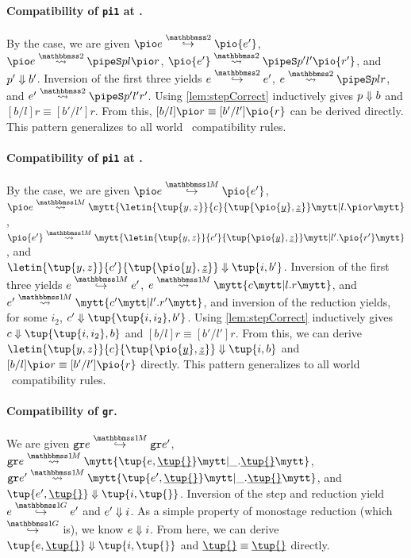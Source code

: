 \begin{abstrsyn}
\paragraph{Compatibility of {\tt pi1} at \bbtwo.}
By the case, we are given 
$\steptwo {\pio e} {\pio {e'}}$, \\
\mbox{$\splittwo {\pio e} A p l {\pio r}$}, 
$\splittwo {\pio {e'}} A {p'} {l'} {\pio {r'}}$,
and ${p'} \Downarrow {b'}$.
Inversion of the first three yields
$\steptwo e {e'}$, $\splittwo e A p l r$, and \mbox{$\splittwo {e'} A {p'} {l'} {r'}$}.
Using \ref{lem:stepCorrect} inductively gives ${p} \Downarrow {b}$ and $[b/l]r \equiv [b'/l']r$.
From this, \mbox{$[b/l]\pio r \equiv [b'/l']\pio {r}$} can be derived directly.
This pattern generalizes to all world \bbtwo\ compatibility rules.

\paragraph{Compatibility of {\tt pi1} at \bbonem.}
By the case, we are given
$\stepmix {\pio e} {\pio {e'}}$, \\
\mbox{$\splitone {\pio e} A {\letin{\tup{y,z}}{c}{\tup{\pio {\exv y},\exv z}}} {l.\pio r}$}, \\
\mbox{$\splitone {\pio {e'}} A {\letin{\tup{y,z}}{c'}{\tup{\pio {\exv y},\exv z}}} {l'.\pio {r'}}$}, and \\
\mbox{$\reduce {\letin{\tup{y,z}}{c'}{\tup{\pio {\exv y},\exv z}}} {\tup{i,b'}}$}.
Inversion of the first three yields 
$\stepmix e {e'}$, $\splitone e A c {l.r}$, and $\splitone {e'} A {c'} {l'.r'}$, 
and inversion of the reduction yields, for some $i_2$, \mbox{$\reduce {c'} {\tup{\tup{i,i_2},b'}}$}.
Using \ref{lem:stepCorrect} inductively gives $\reduce c {\tup{\tup{i,i_2},b}}$ and $[b/l]r \equiv [b'/l']r$.
From this, we can derive $\reduce {\letin{\tup{y,z}}{c}{\tup{\pio {\exv y},\exv z}}} {\tup{i,b}}$ and 
$[b/l]\pio r \equiv [b'/l']\pio {r}$ directly.
This pattern generalizes to all world \bbonem\ compatibility rules.

\paragraph{Compatibility of {\tt gr}.}
We are given 
$\stepmix {\pure e} {\pure {e'}}$, 
$\splitone {\pure e} A {\tup {e,\exv {\tup{}}}} {\_.\exv{\tup{}}}$, 
$\splitone {\pure {e'}} A {\tup {e',\exv {\tup{}}}} {\_.\exv{\tup{}}}$,
and $\reduce {\tup {e',\exv {\tup{}}}} {\tup{i,\tup{}}}$.
Inversion of the step and reduction yield \mbox{$\steppure e {e'}$} and ${e'} \Downarrow {i}$.
As a simple property of monostage reduction (which $\stepsym \bbonep$ is), we know ${e} \Downarrow {i}$.
From here, we can derive $\reduce {\tup {e,\exv {\tup{}}}} {\tup{i,\tup{}}}$ and $\exv{\tup {}} \equiv \exv{\tup {}}$ directly.

\end{abstrsyn}

